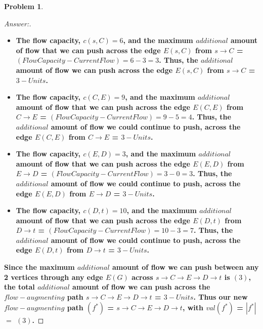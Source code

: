 \documentclass[11pt]{article}
\theoremstyle{definition}
\theoremstyle{definition}
\newtheorem{required}{Problem}
\theoremstyle{definition}
\begin{document}
\begin{required}
\begin{enumerate}[label=(\alph*)]
\begin{proof}[Answer:] \

\begin{itemize}
\item \textbf{The flow capacity, $c(s, C) = 6$, and the maximum $additional$ amount of flow that we can push across the edge  $E(s, C)$ from $s \to C$ = $(Flow Capacity - Current Flow) = 6 - 3 = 3$. Thus, the $additional$ amount of flow we can push across the edge $E(s, C)$ from $s \to C$ = $3-Units$.}
\item \textbf{The flow capacity, $c(C, E) = 9$, and the maximum $additional$ amount of flow that we can push across the edge  $E(C, E)$ from $C \to E$ = $(Flow Capacity - Current Flow) = 9 - 5 = 4$. Thus, the $additional$ amount of flow we could continue to push, across the edge $E(C, E)$ from $C \to E$ = $3-Units$.}
\item \textbf{The flow capacity, $c(E, D) = 3$, and the maximum $additional$ amount of flow that we can push across the edge  $E(E, D)$ from $E \to D$ = $(Flow Capacity - Current Flow) = 3 - 0 = 3$. Thus, the $additional$ amount of flow we could continue to push, across the edge $E(E, D)$ from $E \to D$ = $3-Units$.}
\item \textbf{The flow capacity, $c(D, t) = 10$, and the maximum $additional$ amount of flow that we can push across the edge  $E(D, t)$ from $D \to t$ = $(Flow Capacity - Current Flow) = 10 - 3 = 7$. Thus, the $additional$ amount of flow we could continue to push, across the edge $E(D, t)$ from $D \to t$ = $3-Units$.}
\end{itemize}
\item \textbf{Since the maximum $additional$ amount of flow we can push between any 2 vertices through any edge $E(G)$ across $s \to C \to E \to D \to t$ is $(3)$, the total $additional$ amount of flow we can push across the $flow-augmenting$ path $s \to C \to E \to D \to t$ = $3-Units$. Thus our new $flow-augmenting$ path \color{red}$(f^{*})$ = $s \to C \to E \to D \to t$\color{black}, with \color{red}$val(f^{*})$ = $|f^{*}|$ $=$ $(3)$\color{black}.}


\end{proof}
\end{enumerate}
\end{required}

\end{document}

